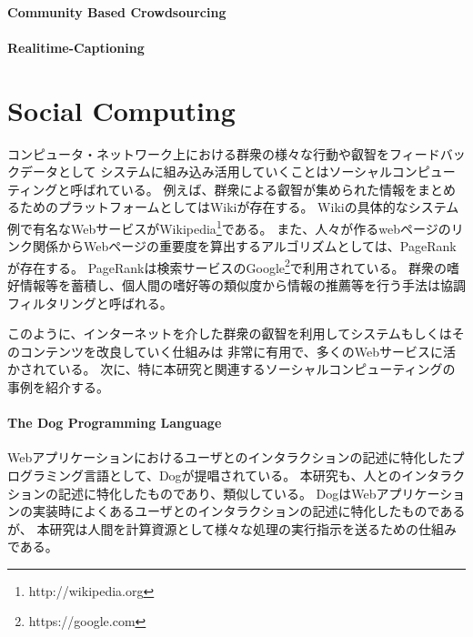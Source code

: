 \paragraph{Community Based
Crowdsourcing}\label{community-based-crowdsourcing}

\mbox{}

\cite{community-based-crowdsourcing}

\paragraph{Realitime-Captioning}\label{realitime-captioning}

\mbox{}

\cite{realtime-captioning}

\section{Social Computing}\label{social-computing}

コンピュータ・ネットワーク上における群衆の様々な行動や叡智をフィードバックデータとして
システムに組み込み活用していくことはソーシャルコンピューティングと呼ばれている。
例えば、群衆による叡智が集められた情報をまとめるためのプラットフォームとしてはWiki\cite{wiki-way}が存在する。
Wikiの具体的なシステム例で有名なWebサービスがWikipedia\footnote{http://wikipedia.org}である。
また、人々が作るwebページのリンク関係からWebページの重要度を算出するアルゴリズムとしては、PageRank\cite{pagerank}が存在する。
PageRankは検索サービスのGoogle\footnote{https://google.com}で利用されている。
群衆の嗜好情報等を蓄積し、個人間の嗜好等の類似度から情報の推薦等を行う手法は協調フィルタリングと呼ばれる\cite{collaborative-filtering}。

このように、インターネットを介した群衆の叡智を利用してシステムもしくはそのコンテンツを改良していく仕組みは
非常に有用で、多くのWebサービスに活かされている。
次に、特に本研究と関連するソーシャルコンピューティングの事例を紹介する。

\paragraph{The Dog Programming
Language}\label{the-dog-programming-language}

\mbox{}

Webアプリケーションにおけるユーザとのインタラクションの記述に特化したプログラミング言語として、Dog\cite{dog}が提唱されている。
本研究も、人とのインタラクションの記述に特化したものであり、類似している。
DogはWebアプリケーションの実装時によくあるユーザとのインタラクションの記述に特化したものであるが、
本研究は人間を計算資源として様々な処理の実行指示を送るための仕組みである。

